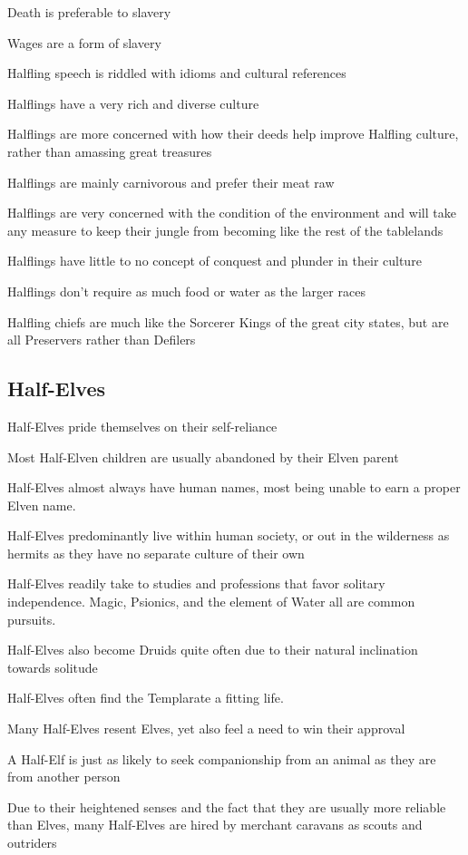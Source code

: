 \begin{multicols}{2}
\begin{description}
    \item Death is preferable to slavery
    \item Wages are a form of slavery
    \item Halfling speech is riddled with idioms and cultural references
    \item Halflings have a very rich and diverse culture
    \item Halflings are more concerned with how their deeds help improve Halfling culture, rather than amassing great treasures
    \item Halflings are mainly carnivorous and prefer their meat raw
    \item Halflings are very concerned with the condition of the environment and will take any measure to keep their jungle from becoming like the rest of the tablelands
    \item Halflings have little to no concept of conquest and plunder in their culture
    \item Halflings don’t require as much food or water as the larger races
    \item Halfling chiefs are much like the Sorcerer Kings of the great city states, but are all Preservers rather than Defilers
\end{description}

\subsection{Half-Elves}

\begin{description}
    \item Half-Elves pride themselves on their self-reliance
    \item Most Half-Elven children are usually abandoned by their Elven parent
    \item Half-Elves almost always have human names, most being unable to earn a proper Elven name.
    \item Half-Elves predominantly live within human society, or out in the wilderness as hermits as they have no separate culture of their own
    \item Half-Elves readily take to studies and professions that favor solitary independence. Magic, Psionics, and the element of Water all are common pursuits.
    \item Half-Elves also become Druids quite often due to their natural inclination towards solitude
    \item Half-Elves often find the Templarate a fitting life.
    \item Many Half-Elves resent Elves, yet also feel a need to win their approval
    \item A Half-Elf is just as likely to seek companionship from an animal as they are from another person
    \item Due to their heightened senses and the fact that they are usually more reliable than Elves, many Half-Elves are hired by merchant caravans as scouts and outriders
\end{description}


\end{multicols}
